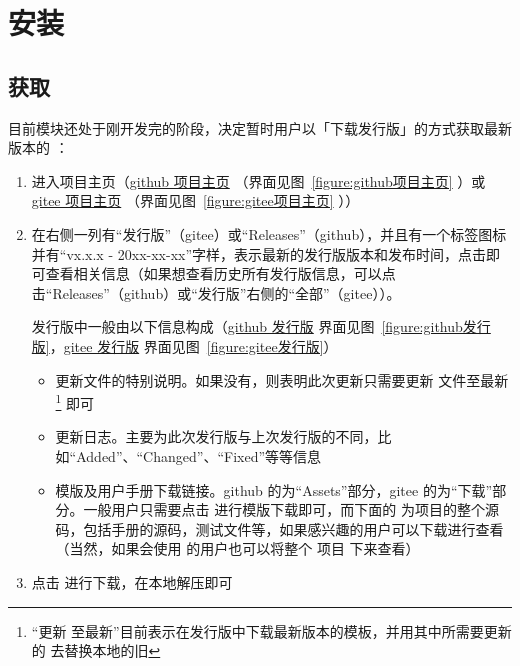 
\section{安装}

\subsection{获取 }

目前模块还处于刚开发完的阶段，决定暂时用户以「下载发行版」的方式获取最新版本的 ：

\begin{enumerate}
  \item 进入项目主页（\href{https://github.com/xkwxdyy/CCNUthesis}{github 项目主页} （界面见图~\ref{figure:github项目主页} ）或 \href{https://gitee.com/xkwxdyy/CCNUthesis}{gitee 项目主页} （界面见图~\ref{figure:gitee项目主页} ））
  \item 在右侧一列有“发行版”（gitee）或“Releases”（github），并且有一个标签图标并有“vx.x.x - 20xx-xx-xx”字样，表示最新的发行版版本和发布时间，点击即可查看相关信息（如果想查看历史所有发行版信息，可以点击“Releases”（github）或“发行版”右侧的“全部”（gitee））。
  
    发行版中一般由以下信息构成（\href{https://github.com/xkwxdyy/CCNUthesis/releases}{github 发行版} 界面见图~\ref{figure:github发行版}，\href{https://gitee.com/xkwxdyy/CCNUthesis/releases}{gitee 发行版} 界面见图~\ref{figure:gitee发行版}）
      \begin{itemize}
        \item 更新文件的特别说明。如果没有，则表明此次更新只需要更新  文件至最新\footnote{“更新  至最新”目前表示在发行版中下载最新版本的模板，并用其中所需要更新的  去替换本地的旧 } 即可
        \item 更新日志。主要为此次发行版与上次发行版的不同，比如“Added”、“Changed”、“Fixed”等等信息
        \item 模版及用户手册下载链接。github 的为“Assets”部分，gitee 的为“下载”部分。一般用户只需要点击  进行模版下载即可，而下面的  为项目的整个源码，包括手册的源码，测试文件等，如果感兴趣的用户可以下载进行查看（当然，如果会使用  的用户也可以将整个  项目  下来查看）
      \end{itemize}
  \item 点击  进行下载，在本地解压即可
\end{enumerate}

